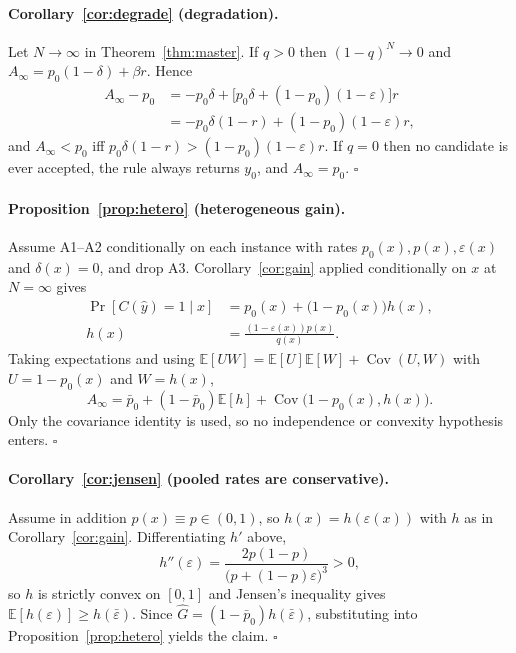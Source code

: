 \documentclass[11pt]{article}
\begin{document}
\paragraph{Corollary~\ref{cor:degrade} (degradation).}
Let $N\to\infty$ in Theorem~\ref{thm:master}. If $q>0$ then $(1-q)^N\to0$ and $A_\infty=p_0(1-\delta)+\beta r$. Hence
\[
\begin{aligned}
A_\infty-p_0&=-p_0\delta+\bigl[p_0\delta+(1-p_0)(1-\varepsilon)\bigr]r\\[2pt]
&=-p_0\delta(1-r)+(1-p_0)(1-\varepsilon)r,
\end{aligned}
\]
and $A_\infty<p_0$ iff $p_0\delta(1-r)>(1-p_0)(1-\varepsilon)r$. If $q=0$ then no candidate is ever accepted, the rule always returns $y_0$, and $A_\infty=p_0$. \hfill$\square$

\paragraph{Proposition~\ref{prop:hetero} (heterogeneous gain).}
Assume A1--A2 conditionally on each instance with rates $p_0(x),p(x),\varepsilon(x)$ and $\delta(x)=0$, and drop A3. Corollary~\ref{cor:gain} applied conditionally on $x$ at $N=\infty$ gives
\[
\begin{aligned}
\Pr[C(\hat y){=}1\mid x]&=p_0(x)+\bigl(1-p_0(x)\bigr)h(x),\\
h(x)&=\tfrac{(1-\varepsilon(x))p(x)}{q(x)} .
\end{aligned}
\]
Taking expectations and using $\mathbb{E}[UW]=\mathbb{E}[U]\mathbb{E}[W]+\operatorname{Cov}(U,W)$ with $U=1-p_0(x)$ and $W=h(x)$,
\[A_\infty=\bar p_0+(1-\bar p_0)\mathbb{E}[h]+\operatorname{Cov}\bigl(1-p_0(x),h(x)\bigr).\]
Only the covariance identity is used, so no independence or convexity hypothesis enters. \hfill$\square$

\paragraph{Corollary~\ref{cor:jensen} (pooled rates are conservative).}
Assume in addition $p(x)\equiv p\in(0,1)$, so $h(x)=h(\varepsilon(x))$ with $h$ as in Corollary~\ref{cor:gain}. Differentiating $h'$ above,
\[h''(\varepsilon)=\frac{2p(1-p)}{\bigl(p+(1-p)\varepsilon\bigr)^{3}}>0 ,\]
so $h$ is strictly convex on $[0,1]$ and Jensen's inequality gives $\mathbb{E}[h(\varepsilon)]\ge h(\bar\varepsilon)$. Since $\widehat G=(1-\bar p_0)h(\bar\varepsilon)$, substituting into Proposition~\ref{prop:hetero} yields the claim. \hfill$\square$
\end{document}
